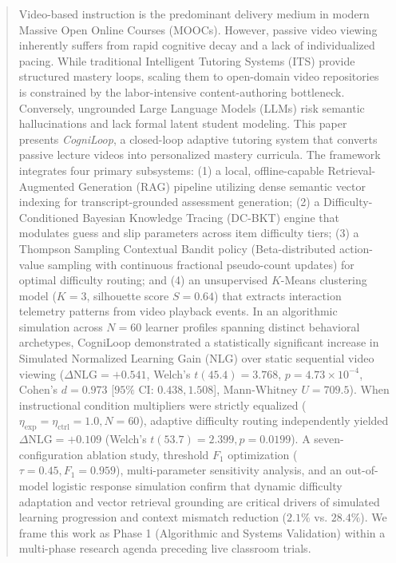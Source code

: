 \documentclass[journal]{IEEEtran}
\begin{document}
%
%
\begin{abstract}
Video-based instruction is the predominant delivery medium in modern Massive Open Online Courses (MOOCs). However, passive video viewing inherently suffers from rapid cognitive decay and a lack of individualized pacing. While traditional Intelligent Tutoring Systems (ITS) provide structured mastery loops, scaling them to open-domain video repositories is constrained by the labor-intensive content-authoring bottleneck. Conversely, ungrounded Large Language Models (LLMs) risk semantic hallucinations and lack formal latent student modeling. This paper presents \textit{CogniLoop}, a closed-loop adaptive tutoring system that converts passive lecture videos into personalized mastery curricula. The framework integrates four primary subsystems: (1) a local, offline-capable Retrieval-Augmented Generation (RAG) pipeline utilizing dense semantic vector indexing for transcript-grounded assessment generation; (2) a Difficulty-Conditioned Bayesian Knowledge Tracing (DC-BKT) engine that modulates guess and slip parameters across item difficulty tiers; (3) a Thompson Sampling Contextual Bandit policy (Beta-distributed action-value sampling with continuous fractional pseudo-count updates) for optimal difficulty routing; and (4) an unsupervised $K$-Means clustering model ($K=3$, silhouette score $S=0.64$) that extracts interaction telemetry patterns from video playback events. In an algorithmic simulation across $N=60$ learner profiles spanning distinct behavioral archetypes, CogniLoop demonstrated a statistically significant increase in Simulated Normalized Learning Gain (NLG) over static sequential video viewing ($\Delta \text{NLG} = +0.541$, Welch's $t(45.4) = 3.768$, $p = 4.73 \times 10^{-4}$, Cohen's $d = 0.973$ [$95\%$ CI: $0.438, 1.508$], Mann-Whitney $U = 709.5$). When instructional condition multipliers were strictly equalized ($\eta_{\text{exp}}=\eta_{\text{ctrl}}=1.0, N=60$), adaptive difficulty routing independently yielded $\Delta\text{NLG}=+0.109$ (Welch's $t(53.7)=2.399, p=0.0199$). A seven-configuration ablation study, threshold $F_1$ optimization ($\tau=0.45, F_1=0.959$), multi-parameter sensitivity analysis, and an out-of-model logistic response simulation confirm that dynamic difficulty adaptation and vector retrieval grounding are critical drivers of simulated learning progression and context mismatch reduction ($2.1\%$ vs. $28.4\%$). We frame this work as Phase 1 (Algorithmic and Systems Validation) within a multi-phase research agenda preceding live classroom trials.
\end{abstract}
\end{document}
